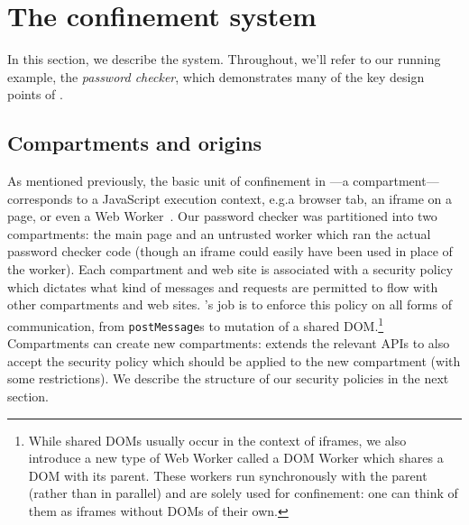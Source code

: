 \section{The \sys{} confinement system}
\label{sec:system}

In this section, we describe the \sys{} system.
%
Throughout, we'll refer to our running example, the \emph{password
checker}, which demonstrates many of the key design points of \sys{}.

\subsection{Compartments and origins}




As mentioned previously, the basic unit of confinement in \sys{}---a
compartment---corresponds to a JavaScript execution context, e.g.\@ a
browser tab, an iframe on a page, or even a Web Worker~\cite{workers}.
%
Our password checker was partitioned into two compartments: the main
page and an untrusted worker which ran the actual password checker code
(though an iframe could easily have been used in place of the worker).
%
Each compartment and web site is associated with a security policy which
dictates what kind of messages and requests are permitted to flow with
other compartments and web sites.
\sys{}'s job is to enforce this policy on all forms of communication, from
{\tt postMessage}s to mutation of a shared DOM\@.\footnote{While shared DOMs
usually occur in the context of iframes, we also introduce a new type
of Web Worker called a DOM Worker which shares a DOM with its parent.
These workers run synchronously with the parent (rather than in parallel)
and are solely used for confinement: one can think of them as iframes
without DOMs of their own.}
%
Compartments can create new compartments: \sys{} extends the relevant
APIs to also accept the security policy which should be applied to the
new compartment (with some restrictions).
%
We describe the structure of our security policies in the next section.

